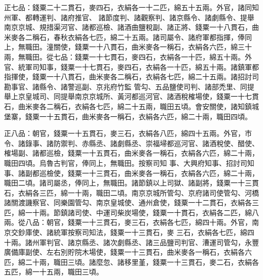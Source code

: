 \begin{pinyinscope}
 正七品：錢粟二十二貫石，麥四石，衣絹各一十二匹，綿五十五兩。外官，諸同知州軍、都轉運判、諸府推官、
 諸節度判、諸觀察判、諸京縣令、諸劇縣令、提舉南京京城、規措渠河官、諸都巡檢、諸酒曲鹽稅副、諸正將、錢粟一十八貫石，曲米麥各二稱石，春秋衣絹各七匹，綿二十五兩。諸司屬令、諸府軍都指揮，俸同上，無職田。潼關使，錢粟一十八貫石，曲米麥各一稱石，衣絹各六匹，綿三十兩，無職田。從七品：錢粟一十七貫石，麥四石，衣絹各一十匹，綿五十兩。外官、統軍司知事，錢粟一十七貫石，麥四石，衣絹各一十匹，綿五十兩。諸鎮軍都指揮使，錢粟一十八貫石，曲米麥各二稱石，衣絹各七匹，綿二十五兩。諸招討司勘事官、諸縣令、諸警巡副、京兆府竹監
 管勾、五品鹽使司判、諸部禿里、同提舉上京皇城司、同提舉南京京城所、黃河都巡河官、諸酒稅榷場使，錢粟一十七貫石，曲米麥各二稱石，衣絹各七匹，綿二十五兩，職田五頃。會安關使，諸知鎮城堡寨，錢粟一十五貫石，曲米麥各一稱石，衣絹各六匹，綿二十兩，職田四頃。



 正八品：朝官，錢粟一十五貫石，麥三石，衣絹各八匹，綿四十五兩。外官，市令、諸錄事、諸防禦判、赤縣丞、諸劇縣丞、崇福埽都巡河官、諸酒稅使、醋使、榷場副、諸都巡檢，錢粟一十五貫石，曲米麥各一稱石，衣絹各六匹，綿二十兩，職田四頃。烏魯古判官，俸同上，無職田。按察司知
 事、大興府知事、招討司知事、諸副都巡檢使，錢粟一十三貫石，曲米麥各一稱石，衣絹各六匹，綿二十兩，職田二頃。諸司屬丞，俸同上，無職田。諸節鎮以上司獄、諸副將，錢粟一十三貫石，衣絹各三匹，綿一十兩，職田二頃。南京京城所管勾、京府諸司使管勾、河橋諸關渡譏察官、同樂園管勾、南京皇城使、通州倉使，錢粟一十二貫石，衣絹各三匹，綿一十兩。節鎮諸司使、中運司柴炭場使，錢粟一十貫石，衣絹各二匹，綿八兩。從八品：朝官，錢粟一十三貫石，麥三石，衣絹各七匹，綿四十兩。外官，南京交鈔庫使、諸統軍按察司知法，錢粟一十三貫石，麥
 三石，衣絹各七匹，綿四十兩。諸州軍判官、諸京縣丞、諸次劇縣丞、諸三品鹽司判官、漕運司管勾，永豐廣備庫副使、左右別貯院木場使，錢粟一十三貫石，曲米麥各一稱石，衣絹各六匹，綿二十兩，職田三頃。諸麼忽、諸移里堇，錢粟一十三貫石，麥二石，衣絹各五匹，綿一十五兩，職田三頃。




\end{pinyinscope}
